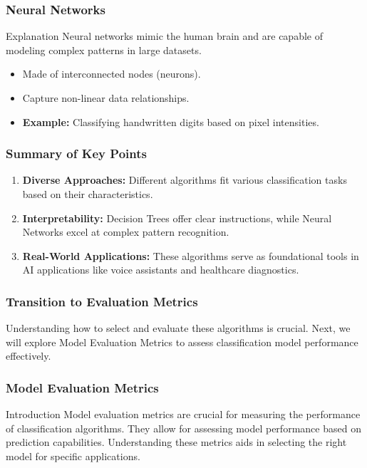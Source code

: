 \documentclass[aspectratio=169]{beamer}
\begin{document}
\begin{frame}[fragile]
    \frametitle{Neural Networks}
    \begin{block}{Explanation}
        Neural networks mimic the human brain and are capable of modeling complex patterns in large datasets.
    \end{block}
    \begin{itemize}
        \item Made of interconnected nodes (neurons).
        \item Capture non-linear data relationships.
        \item \textbf{Example:} Classifying handwritten digits based on pixel intensities.
    \end{itemize}
\end{frame}

\begin{frame}[fragile]
    \frametitle{Summary of Key Points}
    \begin{enumerate}
        \item \textbf{Diverse Approaches:} Different algorithms fit various classification tasks based on their characteristics.
        \item \textbf{Interpretability:} Decision Trees offer clear instructions, while Neural Networks excel at complex pattern recognition.
        \item \textbf{Real-World Applications:} These algorithms serve as foundational tools in AI applications like voice assistants and healthcare diagnostics.
    \end{enumerate}
\end{frame}

\begin{frame}[fragile]
    \frametitle{Transition to Evaluation Metrics}
    Understanding how to select and evaluate these algorithms is crucial. Next, we will explore Model Evaluation Metrics to assess classification model performance effectively.
\end{frame}

\begin{frame}[fragile]
    \frametitle{Model Evaluation Metrics}
    \begin{block}{Introduction}
        Model evaluation metrics are crucial for measuring the performance of classification algorithms. 
        They allow for assessing model performance based on prediction capabilities. Understanding these metrics aids in selecting the right model for specific applications.
    \end{block}
\end{frame}
\end{document}
